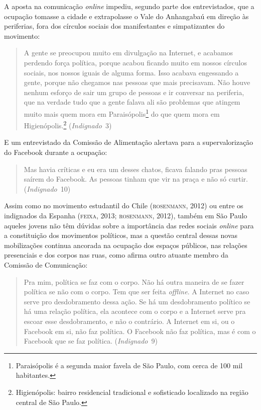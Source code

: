 A aposta na comunicação \textit{online} impediu, segundo parte dos
entrevistados, que a ocupação tomasse a cidade e extrapolasse o Vale
do Anhangabaú em direção às periferias, fora dos círculos sociais dos
manifestantes e simpatizantes do movimento:

\begin{quote}
A gente se preocupou muito em divulgação na Internet, e acabamos
perdendo força política, porque acabou ficando muito em nossos círculos
sociais, nos nossos iguais de alguma forma. Isso acabava engessando a
gente, porque não chegamos nas pessoas que mais precisavam. Não houve
nenhum esforço de sair um grupo de pessoas e ir conversar na periferia,
que na verdade tudo que a gente falava ali são problemas que atingem
muito mais quem mora em Paraisópolis\footnote{Paraisópolis é a segunda
  maior favela de São Paulo, com cerca de 100 mil habitantes.} do
que quem mora em Higienópolis.\footnote{Higienópolis: bairro residencial
  tradicional e sofisticado localizado na região central de São Paulo.}
(\textit{Indignado}~3)
\end{quote}

E um entrevistado da Comissão de Alimentação alertava para a
supervalorização do Facebook durante a ocupação:

\begin{quote}
Mas havia críticas e eu era um desses chatos, ficava falando pras
pessoas saírem do Facebook. As pessoas tinham que vir na praça e não só
curtir. (\textit{Indignado}~10)
\end{quote}

Assim como no movimento estudantil do Chile (\textsc{rosenmann}, 2012) ou entre
os indignados da Espanha (\textsc{feixa}, 2013; \textsc{rosenmann}, 2012), também em São
Paulo aqueles jovens não têm dúvidas sobre a importância das redes
sociais \textit{online} para a constituição dos movimentos políticos, mas
a questão central dessas novas mobilizações continua ancorada na
ocupação dos espaços públicos, nas relações presenciais e dos corpos nas
ruas, como afirma outro atuante membro da Comissão de Comunicação:

\begin{quote}
Pra mim, política se faz com o corpo. Não há outra maneira de se
fazer política se não com o corpo. Tem que ser feita \textit{offline}. A
Internet no caso serve pro desdobramento dessa ação. Se há um
desdobramento político se há uma relação política, ela acontece com o
corpo e a Internet serve pra escoar esse desdobramento, e não o
contrário. A Internet em si, ou o Facebook em si, não faz política. O
Facebook não faz política, mas é com o Facebook que se faz política.
(\textit{Indignado}~9)
\end{quote}


